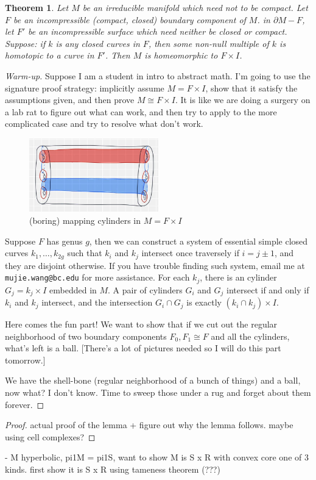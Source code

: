 \documentclass[12pt]{amsart}
\newtheorem{sat}{Theorem}[section]		\newtheorem{lem}[sat]{Lemma}
\theoremstyle{remark}
\begin{document}
\begin{sat}
	Let \(M\) be an irreducible manifold which need not to be compact. Let \(F\) be an incompressible (compact, closed) boundary component of \(M\). in \(\partial M - F\), let \(F'\) be an incompressible surface which need neither be closed or compact. Suppose: if \(k\) is any closed curves in \(F\), then some non-null multiple of \(k\) is homotopic to a curve in \(F'\). Then \(M\) is homeomorphic to \(F\times I\).
\end{sat}


\begin{proof}[Warm-up]
	 Suppose I am a student in intro to abstract math. I'm going to use the signature proof strategy: implicitly assume \(M = F \times I\), show that it satisfy the assumptions given, and then prove \(M \cong F \times I\). It is like we are doing a surgery on a lab rat to figure out what can work, and then try to apply to the more complicated case and try to resolve what don't work.
	 \begin{figure}[h!]
		\centering
		\includegraphics[width = 0.5\textwidth]{IMG_0627.jpg}
	 	\caption{(boring) mapping cylinders in \(M = F\times I\)}
	 \end{figure}

	 Suppose \(F\) has genus \(g\), then we can construct a system of essential simple closed curves \(k_1, \ldots, k_{2g}\) such that \(k_i\) and \(k_j\) intersect once traversely if \(i = j \pm 1\), and they are disjoint otherwise. If you have trouble finding such system, email me at \texttt{mujie.wang@bc.edu} for more assistance. For each \(k_j\), there is an cylinder \(G_j = k_j \times I\) embedded in \(M\). A pair of cylinders \(G_i\) and \(G_j\) intersect if and only if \(k_i\) and \(k_j\) intersect, and the intersection \(G_i \cap G_j\) is exactly \((k_i \cap k_j)\times I\).  

	 Here comes the fun part! We want to show that if we cut out the regular neighborhood of two boundary components \(F_0, F_1 \cong F\) and all the cylinders, what's left is a ball. [There's a lot of pictures needed so I will do this part tomorrow.]

	 We have the shell-bone (regular neighborhood of a bunch of things) and a ball, now what? I don't know. Time to sweep those under a rug and forget about them forever.
\end{proof}

\begin{proof}
	actual proof of the lemma + figure out why the lemma follows. maybe using cell complexes?
\end{proof}

- M hyperbolic, pi1M = pi1S, want to show M is S x R with convex core one of 3 kinds. first show it is S x R using tameness theorem (???) 
\end{document}

